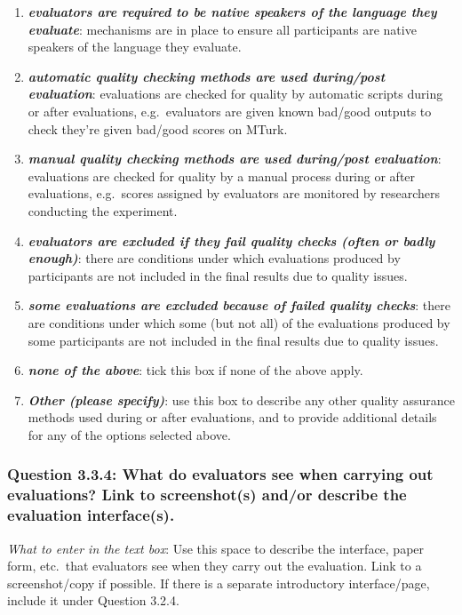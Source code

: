 \documentclass[11pt,a4paper]{article}
\newcommand{\egcvalue}[1]{\textbf{\textit{#1}}}
\begin{document}
\begin{enumerate}[itemsep=0cm,leftmargin=0.5cm,label={\small $\square$}]
    \item \egcvalue{evaluators are required to be native speakers of the language they evaluate}: mechanisms are in place to ensure all participants are native speakers of the language they evaluate.
    \item \egcvalue{automatic quality checking methods are used during/post evaluation}: evaluations are checked for quality by automatic scripts during or after evaluations, e.g.\ evaluators are given known bad/good outputs to check they're given bad/good scores on MTurk.
    \item \egcvalue{manual quality checking methods are used during/post evaluation}: evaluations are checked for quality by a manual process  during or after evaluations, e.g.\ scores assigned by evaluators are monitored by researchers conducting the experiment.
    \item \egcvalue{evaluators are excluded if they fail quality checks (often or badly enough)}: there are conditions under which evaluations produced by participants are not included in the final results due to quality issues.
    \item \egcvalue{some evaluations are excluded because of failed quality checks}: there are conditions under which some (but not all) of the evaluations produced by some participants are not included in the final results due to quality issues.
    \item \egcvalue{none of the above}: tick this box if none of the above apply.
    \item \egcvalue{Other (please specify)}: use this box to describe any other quality assurance methods used during or after evaluations, and to provide additional details for any of the options selected above.
\end{enumerate}

\subsubsection*{Question 3.3.4:  What do evaluators see when carrying out evaluations? Link to screenshot(s) and/or describe the evaluation interface(s).}
\vspace{-.1cm}

\vspace{.3cm}
\noindent\textit{What to enter in the text box}: Use this space to describe the interface, paper form, etc.\ that evaluators see when they carry out the evaluation. Link to a screenshot/copy if possible. If there is a separate introductory interface/page, include it under Question 3.2.4.
\end{document}
